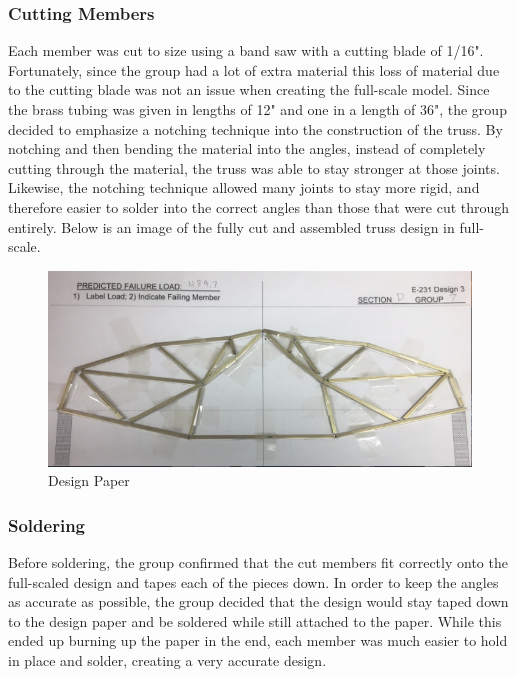 \documentclass{article}
\begin{document}
\subsubsection{Cutting Members}
Each member was cut to size using a band saw with a cutting blade of 1/16". Fortunately, since the group had a lot of extra material this loss of material due to the cutting blade was not an issue when creating the full-scale model. Since the brass tubing was given in lengths of 12" and one in a length of 36", the group decided to emphasize a notching technique into the construction of the truss. By notching and then bending the material into the angles, instead of completely cutting through the material, the truss was able to stay stronger at those joints. Likewise, the notching technique allowed many joints to stay more rigid, and therefore easier to solder into the correct angles than those that were cut through entirely. Below is an image of the fully cut and assembled truss design in full-scale. 

\begin{figure}[ht]
\caption{Design Paper}
\centering
\includegraphics[width=400pt]{DesignPaper.png}
\end{figure}

\newpage

\subsubsection{Soldering}
Before soldering, the group confirmed that the cut members fit correctly onto the full-scaled design and tapes each of the pieces down. In order to keep the angles as accurate as possible, the group decided that the design would stay taped down to the design paper and be soldered while still attached to the paper. While this ended up burning up the paper in the end, each member was much easier to hold in place and solder, creating a very accurate design. 
\end{document}
